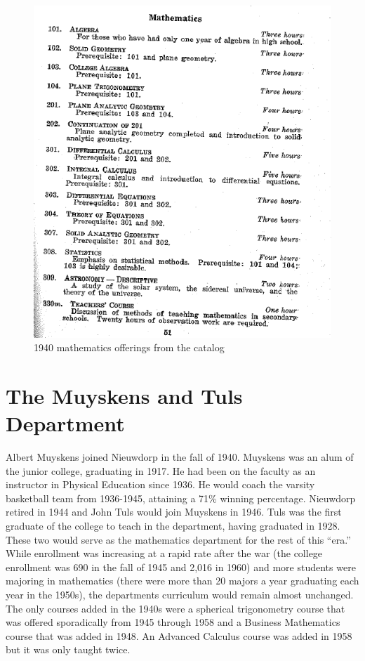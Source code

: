 \documentclass[
]{book}
\begin{document}
\begin{figure}

{\centering \includegraphics[width=0.6\linewidth]{images/1940Math} 

}

\caption{1940 mathematics offerings from the catalog}\label{fig:1940math}
\end{figure}

\hypertarget{the-muyskens-and-tuls-department}{%
\section{The Muyskens and Tuls Department}\label{the-muyskens-and-tuls-department}}

Albert Muyskens joined Nieuwdorp in the fall of 1940. Muyskens was an alum of the junior college, graduating in 1917. He had been on the faculty as an instructor in Physical Education since 1936. He would coach the varsity basketball team from 1936-1945, attaining a 71\% winning percentage. Nieuwdorp retired in 1944 and John Tuls would join Muyskens in 1946. Tuls was the first graduate of the college to teach in the department, having graduated in 1928.\\
These two would serve as the mathematics department for the rest of this ``era.''
While enrollment was increasing at a rapid rate after the war (the college enrollment was 690 in the fall of 1945 and 2,016 in 1960) and more students were majoring in mathematics (there were more than 20 majors a year graduating each year in the 1950s), the departments curriculum would remain almost unchanged. The only courses added in the 1940s were a spherical trigonometry course that was offered sporadically from 1945 through 1958 and a Business Mathematics course that was added in 1948. An Advanced Calculus course was added in 1958 but it was only taught twice.
\end{document}
